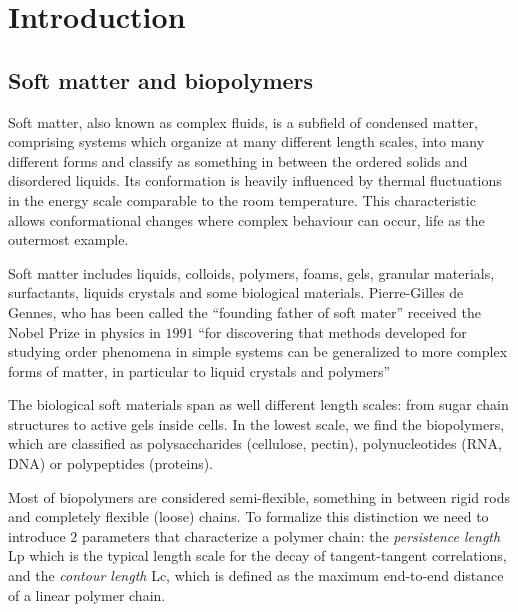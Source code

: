 
\chapter{Introduction} %

\label{Introduction} %



    
    

\section{Soft matter and biopolymers}
Soft matter, also known as complex fluids, is a subfield of condensed
matter, comprising systems which organize at many different length scales, into
many different forms and classify as something in between the
ordered solids and disordered liquids. Its conformation is heavily
influenced by thermal fluctuations in the energy scale comparable to the room
temperature. This characteristic allows conformational changes where complex
behaviour can occur, life as the outermost example.


Soft matter includes liquids, colloids, polymers, foams, gels, granular
materials, surfactants, liquids crystals and some biological materials.
Pierre-Gilles de Gennes, who has been called the ``founding father of soft
mater'' received the Nobel Prize in physics in $1991$ ``for discovering that 
methods developed for studying order phenomena in simple systems can be 
generalized to more complex forms of matter, in particular to liquid  crystals
and polymers''\citep{de_gennes_pierre-gilles_????}
 
The biological soft materials span as well different length scales: from sugar
chain structures to active gels inside cells. In the
lowest scale, we find the biopolymers, which are classified as polysaccharides
(cellulose, pectin),  polynucleotides (RNA, DNA) or polypeptides (proteins).
 
Most of biopolymers are considered semi-flexible, something in between
rigid rods and completely flexible (loose) chains.  To formalize this
distinction we need to introduce $2$ parameters that characterize a polymer
chain: the \emph{persistence length} \gls{Lp} which is the typical length scale
for the decay of tangent-tangent correlations, and the \emph{contour length}
\gls{Lc}, which is defined as the maximum end-to-end distance of a linear
polymer chain.

